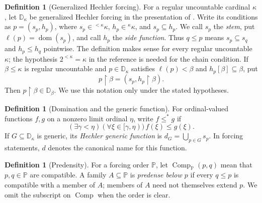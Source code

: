 \documentclass[11pt,a4paper]{amsart}
\theoremstyle{definition}
\newtheorem{definition}[theorem]{Definition}
\theoremstyle{remark}
\newcommand{\D}{\mathbb D}
\DeclareMathOperator{\dom}{dom}
\DeclareMathOperator{\Comp}{Comp}
\begin{document}
\begin{definition}[Generalized Hechler forcing]\label{def:hechler}
For a regular uncountable cardinal \(\kappa\), let
\(\D_\kappa\) be generalized Hechler forcing in the presentation
of \cite[Definition~48]{BBFM}. Write its conditions as
\(p=(s_p,h_p)\), where \(s_p\in{}^{<\kappa}\kappa\),
\(h_p\in{}^\kappa\kappa\), and \(s_p\subseteq h_p\).
We call \(s_p\) the \emph{stem}, put \(\ell(p)=\dom(s_p)\),
and call \(h_p\) the \emph{side function}. Thus \(q\leq p\)
means \(s_p\subseteq s_q\) and \(h_p\leq h_q\) pointwise.
The definition makes sense for every regular uncountable
\(\kappa\); the hypothesis \(2^{<\kappa}=\kappa\) in the
reference is needed for the chain condition.
If \(\beta\leq\kappa\) is regular uncountable and
\(p\in\D_\kappa\) satisfies \(\ell(p)<\beta\) and
\(h_p[\beta]\subseteq\beta\), put
\[
 p\restriction\beta=(s_p,h_p\restriction\beta).
\]
Then \(p\restriction\beta\in\D_\beta\). We use this
notation only under the stated hypotheses.
\end{definition}

\begin{definition}[Domination and the generic function]
\label{def:eventual-domination}\label{def:generic-function}
For ordinal-valued functions \(f,g\) on a nonzero limit ordinal
\(\eta\), write \(f\leq^*g\) if
\[
 (\exists\gamma<\eta)(\forall\xi\in[\gamma,\eta))\,
 f(\xi)\leq g(\xi).
\]
If \(G\subseteq\D_\kappa\) is generic, its \emph{Hechler generic
function} is \(d_G=\bigcup_{p\in G}s_p\). In forcing statements,
\(d\) denotes the canonical name for this function.
\end{definition}

\begin{definition}[Predensity]\label{def:compatibility}
\label{def:predensity}
For a forcing order \(\mathbb P\), let
\(\Comp_{\mathbb P}(p,q)\) mean that \(p,q\in\mathbb P\) are
compatible. A family \(A\subseteq\mathbb P\) is \emph{predense
below \(p\)} if every \(q\leq p\) is compatible with a member of
\(A\); members of \(A\) need not themselves extend \(p\).
We omit the subscript on \(\Comp\) when the order is clear.
\end{definition}
\end{document}
